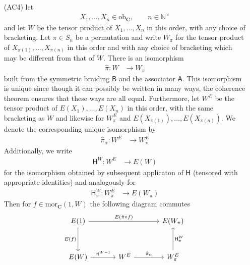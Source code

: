 \begin{thm}
\begin{enumerate}
\begin{enumerate}
\item[(AC4)]
let
\begin{align*}
  X_{1}
  ,
  \ldots
  ,
  X_{n}
  \in
  \mathrm{ob}_{\mathbf{C}}
  ,\qquad
  n
  \in
  \mathbb{N}^{\times}
\end{align*}
and let $W$ be the tensor product of $X_{1},\dots,X_{n}$ in this order, with any choice of bracketing. Let $\pi \in S_{n}$ be a permutation and write $W_{\pi}$ for the tensor product of $X_{\pi(1)},\dots,X_{\pi(n)}$ in this order and with any choice of bracketing which may be different from that of $W$. There is an isomorphism
\begin{align*}
    \hat{\pi}
    \colon
    W
    &\to
    W_{\pi}
\end{align*}
built from the symmetric braiding $\mathsf{B}$ and the associator $\mathsf{A}$. This isomorphism is unique since though it can possibly be written in many ways, the coherence theorem ensures that these ways are all equal. Furthermore, let $W^{E}$ be the tensor product of $E(X_{1}),\dots,E(X_{n})$ in this order, with the same bracketing as $W$ and likewise for $W_{\pi}^{E}$ and $E(X_{\pi(1)}),\dots,E(X_{\pi(n)})$. We denote the corresponding unique isomorphism by
\begin{align*}
  \hat{\pi}_{\alpha}
  \colon
  W^{E}
  &\to
  W_{\pi}^{E}
\end{align*}
Additionally, we write
\begin{align*}
  \mathsf{H}^{W}
  \colon
  W^{E}
  &\to
  E(W)
\end{align*}
for the isomorphism obtained by subsequent applicaton of $\mathsf{H}$ (tensored with appropriate identities) and analogously for
\begin{align*}
  \mathsf{H}_{\pi}^{W}
  \colon
  W_{\pi}^{E}
  &\to
  E(W_{\pi})
\end{align*}
Then for $f \in \mathrm{mor}_{\mathbf{C}}(1,W)$ the following diagram commutes
\begin{equation*}
\begin{tikzcd}[row sep=3.3em,column sep=large]
  E(1)
  \ar{rr}{E(\hat{\pi} \circ f)}
  \ar{d}[swap]{E(f)}
  &
  &
  E(W_{\pi})
  \\
  E(W)
  \ar{r}{\mathsf{H}^{W -1}}
  &
  W^{E}
  \ar{r}{\hat{\pi}_{\alpha}}
  &
  W_{\pi}^{E}
  \ar{u}[swap]{\mathsf{H}_{\pi}^{W}}
\end{tikzcd}
\end{equation*}


\end{enumerate}
\end{enumerate}
\end{thm}
